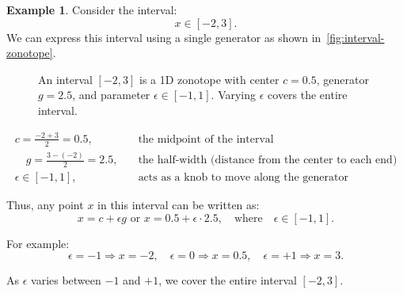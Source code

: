 \documentclass[oneside,11pt,dvipsnames]{book}
\numberwithin{equation}{section}
\theoremstyle{definition}
\newtheorem{example}{Example}[section]
\theoremstyle{remark}
\begin{document}
\begin{example}

    Consider the interval:
    \[
    x \in [-2, 3].
    \]
    We can express this interval using a single generator as shown in~\autoref{fig:interval-zonotope}.

    \begin{figure}
    \centering
    \caption{An interval $[-2,3]$ is a 1D zonotope with center $c=0.5$, generator $g=2.5$, and parameter $\epsilon\in[-1,1]$. Varying $\epsilon$ covers the entire interval.}
    \label{fig:interval-zonotope}
    \end{figure}


    \begin{equation}
    \begin{aligned}
    c = \frac{-2 + 3}{2} = 0.5, & \quad\text{the midpoint of the interval}\\
    \quad g = \frac{3 - (-2)}{2} = 2.5, &  \quad\text{the half-width (distance from the center to each end)}\\
    \epsilon \in [-1, 1], & \quad\text{acts as a knob to move along the generator}
    \end{aligned}
    \end{equation}

    Thus, any point \(x\) in this interval can be written as:
    \[
    x = c + \epsilon g \text{ or } x = 0.5 + \epsilon \cdot 2.5,
    \quad \text{where} \quad \epsilon \in [-1, 1].
    \]


    For example:
    \[
    \epsilon = -1 \Rightarrow x = -2,
    \quad
    \epsilon = 0 \Rightarrow x = 0.5,
    \quad
    \epsilon = +1 \Rightarrow x = 3.
    \]

    As \(\epsilon\) varies between \(-1\) and \(+1\), we cover the entire interval \([-2, 3]\).

\end{example}
\end{document}
